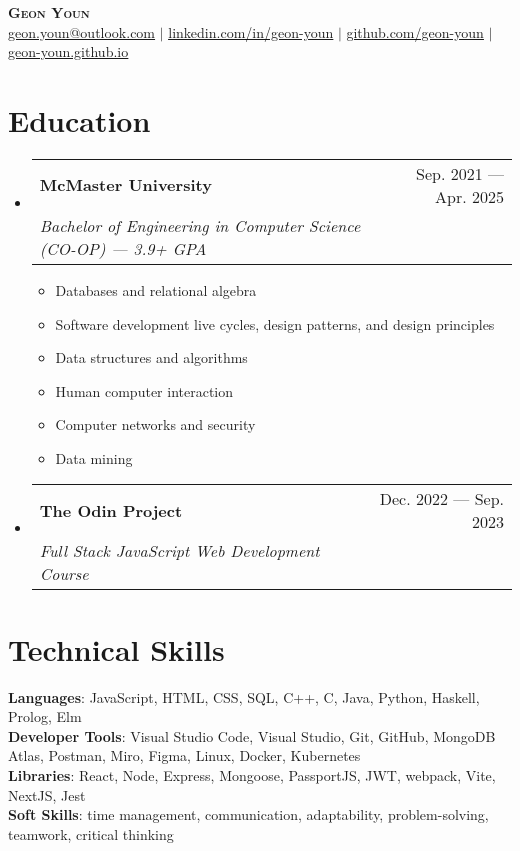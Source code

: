\documentclass[letterpaper,11pt]{article}
\makeatletter
\newcommand{\resumeItem}[1]{
	\item\small{
		{#1 \vspace{-2pt}}
	}
}
\newcommand{\resumeSubheading}[4]{
	\vspace{-2pt}\item
	\begin{tabular*}{0.97\textwidth}[t]{l@{\extracolsep{\fill}}r}
		\textbf{#1} & #2 \\
		\textit{\small#3} & \textit{\small #4} \\
	\end{tabular*}\vspace{-7pt}
}
\newcommand{\resumeSubHeadingListStart}{\begin{itemize}[leftmargin=0.15in,
			label={}]}
\newcommand{\resumeSubHeadingListEnd}{\end{itemize}}
\newcommand{\resumeItemListStart}{\begin{itemize}}
\newcommand{\resumeItemListEnd}{\end{itemize}\vspace{-5pt}}
\makeatother
\begin{document}
\begin{center}
	\textbf{\Huge \scshape Geon Youn} \\ \vspace{1pt}
	\small
	\href{mailto:geon.youn@outlook.com}{\underline{geon.youn@outlook.com}}
	$|$
	\href{https://linkedin.com/in/geon-youn}{\underline{linkedin.com/in/geon-youn}}
	$|$
	\href{https://github.com/geon-youn}{\underline{github.com/geon-youn}}
  $|$
  \href{https://geon-youn.github.io/}{\underline{geon-youn.github.io}}
\end{center}

\section{Education}
\resumeSubHeadingListStart
\resumeSubheading
{McMaster University}{Sep. 2021 --- Apr. 2025}
{Bachelor of Engineering in Computer Science (CO-OP) --- 3.9+ GPA}{}
\resumeItemListStart
\resumeItem{Databases and relational algebra}
\resumeItem{Software development live cycles, design patterns, and design principles}
\resumeItem{Data structures and algorithms}
\resumeItem{Human computer interaction}
\resumeItem{Computer networks and security}
\resumeItem{Data mining}
\resumeItemListEnd
\resumeSubheading
{The Odin Project}{Dec. 2022 --- Sep. 2023}
{Full Stack JavaScript Web Development Course}{}
\resumeSubHeadingListEnd

\section{Technical Skills}
\begin{itemize}[leftmargin=0.15in, label={}]
	\small{\item{
		            \textbf{Languages}{: JavaScript, HTML, CSS, SQL, C++, C, Java, Python, Haskell,
			            Prolog, Elm} \\
		            \textbf{Developer Tools}{: Visual Studio Code, Visual Studio, Git, GitHub, MongoDB Atlas, Postman, Miro, Figma, Linux, Docker, Kubernetes} \\
		            \textbf{Libraries}{: React, Node, Express, Mongoose, PassportJS, JWT, webpack, Vite, NextJS, Jest} \\
		            \textbf{Soft Skills}{: time management,
			            communication, adaptability,
			            problem-solving, teamwork, critical thinking}
		      }}
\end{itemize}
\end{document}
